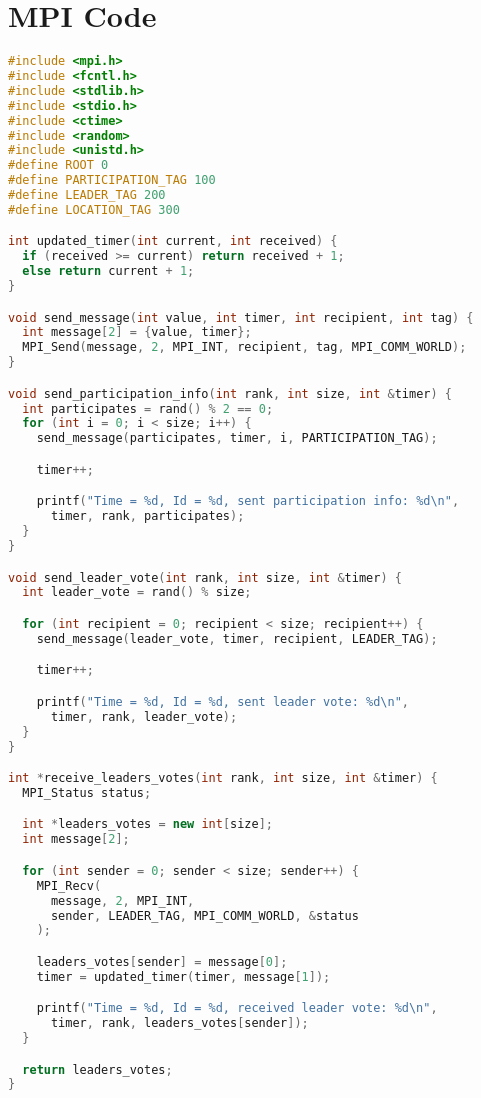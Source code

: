 \documentclass{article}
\begin{document}
\section{ MPI Code}
\begin{lstlisting}[language=C++, caption=Message Passing Interface C++ Code, label=lst:code]
#include <mpi.h>
#include <fcntl.h>
#include <stdlib.h>
#include <stdio.h>
#include <ctime>
#include <random>
#include <unistd.h>
#define ROOT 0
#define PARTICIPATION_TAG 100
#define LEADER_TAG 200
#define LOCATION_TAG 300

int updated_timer(int current, int received) {
  if (received >= current) return received + 1;
  else return current + 1;
}

void send_message(int value, int timer, int recipient, int tag) {
  int message[2] = {value, timer};
  MPI_Send(message, 2, MPI_INT, recipient, tag, MPI_COMM_WORLD);
}

void send_participation_info(int rank, int size, int &timer) {
  int participates = rand() % 2 == 0;
  for (int i = 0; i < size; i++) {
    send_message(participates, timer, i, PARTICIPATION_TAG);

    timer++;

    printf("Time = %d, Id = %d, sent participation info: %d\n",
      timer, rank, participates);
  }
}

void send_leader_vote(int rank, int size, int &timer) {
  int leader_vote = rand() % size;

  for (int recipient = 0; recipient < size; recipient++) {
    send_message(leader_vote, timer, recipient, LEADER_TAG);

    timer++;

    printf("Time = %d, Id = %d, sent leader vote: %d\n",
      timer, rank, leader_vote);
  }
}

int *receive_leaders_votes(int rank, int size, int &timer) {
  MPI_Status status;

  int *leaders_votes = new int[size];
  int message[2];

  for (int sender = 0; sender < size; sender++) {
    MPI_Recv(
      message, 2, MPI_INT,
      sender, LEADER_TAG, MPI_COMM_WORLD, &status
    );

    leaders_votes[sender] = message[0];
    timer = updated_timer(timer, message[1]);

    printf("Time = %d, Id = %d, received leader vote: %d\n",
      timer, rank, leaders_votes[sender]);
  }

  return leaders_votes;
}



\end{lstlisting}
\end{document}
